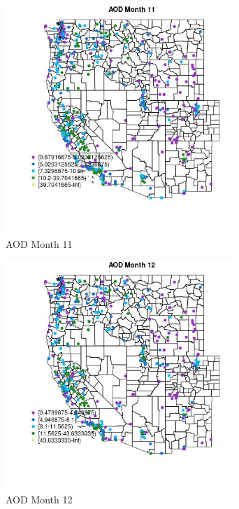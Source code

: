 \begin{figure} 
\centering  
\includegraphics[width=0.77\textwidth]{Code_Outputs/ML_input_report_ML_input_PM25_Step5_part_d_de_duplicated_aves_ML_input_MapObsMo11AOD.jpg} 
\caption{\label{fig:ML_input_report_ML_input_PM25_Step5_part_d_de_duplicated_aves_ML_inputMapObsMo11AOD}AOD Month 11} 
\end{figure} 
 

\begin{figure} 
\centering  
\includegraphics[width=0.77\textwidth]{Code_Outputs/ML_input_report_ML_input_PM25_Step5_part_d_de_duplicated_aves_ML_input_MapObsMo12AOD.jpg} 
\caption{\label{fig:ML_input_report_ML_input_PM25_Step5_part_d_de_duplicated_aves_ML_inputMapObsMo12AOD}AOD Month 12} 
\end{figure} 
 

